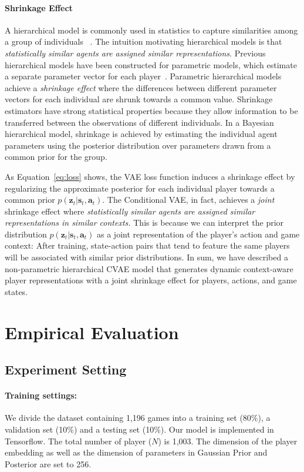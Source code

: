\documentclass[letterpaper]{article} %
\newcommand{\latentvariables}{\mathbf{z}}
\newcommand{\state}{\mathbf{s}}
\newcommand{\action}{\mathbf{a}}
\newcommand{\prior}{p}
\begin{document}
\paragraph{Shrinkage Effect}
A hierarchical model is commonly used in statistics to capture similarities among a group of individuals ~\cite{McCallum1998,kruschke2014doing}.  The intuition motivating hierarchical models is that {\em statistically similar agents are assigned similar representations}. Previous hierarchical models have been constructed for parametric models, which estimate a separate parameter vector for each player~\cite{Murphybook12}. Parametric hierarchical models achieve a {\em shrinkage effect} where the differences between different parameter vectors for each individual are shrunk towards a common value. Shrinkage estimators have strong statistical properties because they allow information to be transferred between the observations of different individuals. 
In a Bayesian hierarchical model, shrinkage is achieved by estimating the individual agent parameters using the posterior distribution over parameters drawn from a common prior for the group. 

As Equation~\eqref{eq:loss} shows, the VAE loss function induces a shrinkage effect by regularizing the approximate posterior for each individual player towards a common prior $\prior(\latentvariables_{t}|\state_{t},\action_{t})$. The Conditional VAE, in fact, achieves a {\em joint} shrinkage effect where {\em statistically similar agents are assigned similar representations in similar contexts.} This is because we can interpret the prior distribution $\prior(\latentvariables_{t}|\state_{t},\action_{t})$ as a joint representation of the player's action and game context: After training, state-action pairs that tend to feature the same players will be associated with similar prior distributions. In sum, we have described a non-parametric hierarchical CVAE model that generates dynamic context-aware player representations with a joint shrinkage effect for players, actions, and game states. 

\section{Empirical Evaluation}

\subsection{Experiment Setting}
\paragraph{Training settings:}
We divide the dataset containing 1,196 games into a training set (80\%), a validation set (10\%) and a testing set (10\%). Our model is implemented in Tensorflow. The total number of player ($N$) is 1,003. The dimension of the player embedding as well as the dimension of parameters in Gaussian Prior and Posterior are set to 256.
\end{document}
